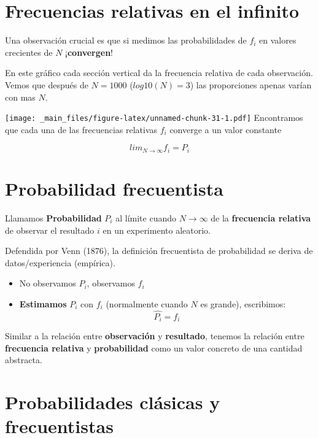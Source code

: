 \documentclass[
]{book}
\providecommand{\tightlist}{%
  \setlength{\itemsep}{0pt}\setlength{\parskip}{0pt}}
\begin{document}
\hypertarget{frecuencias-relativas-en-el-infinito}{%
\section{Frecuencias relativas en el infinito}\label{frecuencias-relativas-en-el-infinito}}

Una observación crucial es que si medimos las probabilidades de \(f_i\) en valores crecientes de \(N\) ¡\textbf{convergen}!

En este gráfico cada sección vertical da la frecuencia relativa de cada observación. Vemos que después de \(N=1000\) (\(log10(N)=3\)) las proporciones apenas varían con mas \(N\).

\texttt{[image: \_main\_files/figure-latex/unnamed-chunk-31-1.pdf]}
Encontramos que cada una de las frecuencias relativas \(f_i\) converge a un valor constante

\[lim_{N\rightarrow \infty} f_i = P_i\]

\hypertarget{probabilidad-frecuentista}{%
\section{Probabilidad frecuentista}\label{probabilidad-frecuentista}}

Llamamos \textbf{Probabilidad} \(P_i\) al límite cuando \(N \rightarrow \infty\) de la \textbf{frecuencia relativa} de observar el resultado \(i\) en un experimento aleatorio.

Defendida por Venn (1876), la definición frecuentista de probabilidad se deriva de datos/experiencia (empírica).

\begin{itemize}
\tightlist
\item
  No observamos \(P_i\), observamos \(f_i\)
\item
  \textbf{Estimamos} \(P_i\) con \(f_i\) (normalmente cuando \(N\) es grande), escribimos: \[\hat{P_i}=f_i\]
\end{itemize}

Similar a la relación entre \textbf{observación} y \textbf{resultado}, tenemos la relación entre \textbf{frecuencia relativa} y \textbf{probabilidad} como un valor concreto de una cantidad abstracta.

\hypertarget{probabilidades-cluxe1sicas-y-frecuentistas}{%
\section{Probabilidades clásicas y frecuentistas}\label{probabilidades-cluxe1sicas-y-frecuentistas}}
\end{document}
